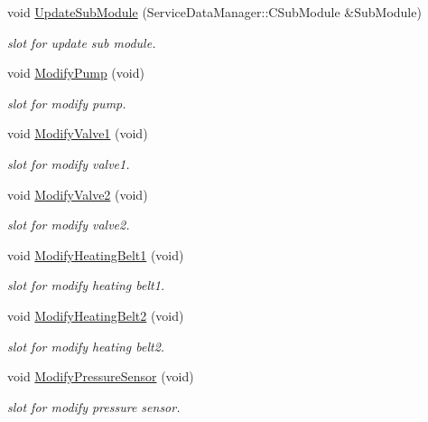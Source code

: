 \begin{DoxyCompactItemize}
\item 
void \hyperlink{classSystemTracking_1_1CLaSystem_a795880dc26e27d846089af9aaf5fc2b7}{\-Update\-Sub\-Module} (\-Service\-Data\-Manager\-::\-C\-Sub\-Module \&\-Sub\-Module)
\begin{DoxyCompactList}\small\item\em slot for update sub module. \end{DoxyCompactList}\item 
void \hyperlink{classSystemTracking_1_1CLaSystem_a064eaf9290f6266e871ab47c3a428fbe}{\-Modify\-Pump} (void)
\begin{DoxyCompactList}\small\item\em slot for modify pump. \end{DoxyCompactList}\item 
void \hyperlink{classSystemTracking_1_1CLaSystem_ade23c453b1ada98852272e9950b63a65}{\-Modify\-Valve1} (void)
\begin{DoxyCompactList}\small\item\em slot for modify valve1. \end{DoxyCompactList}\item 
void \hyperlink{classSystemTracking_1_1CLaSystem_a1f35ef2bf49f758b766d8646b6b28eaa}{\-Modify\-Valve2} (void)
\begin{DoxyCompactList}\small\item\em slot for modify valve2. \end{DoxyCompactList}\item 
void \hyperlink{classSystemTracking_1_1CLaSystem_acf3fb8df911973c605f66ce42e87df3c}{\-Modify\-Heating\-Belt1} (void)
\begin{DoxyCompactList}\small\item\em slot for modify heating belt1. \end{DoxyCompactList}\item 
void \hyperlink{classSystemTracking_1_1CLaSystem_a8ae8ef8be8bd36d6ac57fd7aa714d66a}{\-Modify\-Heating\-Belt2} (void)
\begin{DoxyCompactList}\small\item\em slot for modify heating belt2. \end{DoxyCompactList}\item 
void \hyperlink{classSystemTracking_1_1CLaSystem_aa0e2174b937566bf796aec4550f7ff07}{\-Modify\-Pressure\-Sensor} (void)
\begin{DoxyCompactList}\small\item\em slot for modify pressure sensor. \end{DoxyCompactList}\item 

\end{DoxyCompactItemize}
